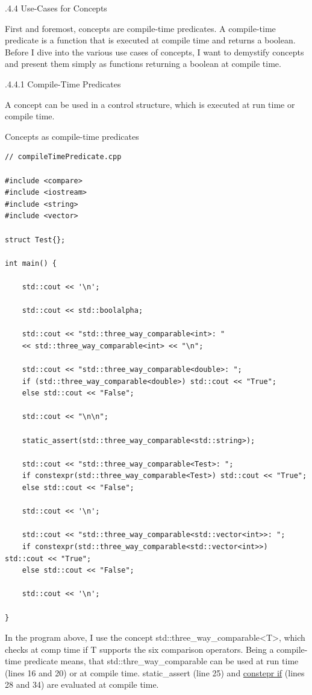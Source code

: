 .4.4\hspace{0.2cm} Use-Cases for Concepts

First and foremost, concepts are compile-time predicates. A compile-time predicate is a function that is executed at compile time and returns a boolean. Before I dive into the various use cases of concepts, I want to demystify concepts and present them simply as functions returning a boolean at compile time.

.4.4.1\hspace{0.2cm} Compile-Time Predicates

A concept can be used in a control structure, which is executed at run time or compile time.

\noindent
Concepts as compile-time predicates
\begin{lstlisting}[style=styleCXX]
// compileTimePredicate.cpp

#include <compare>
#include <iostream>
#include <string>
#include <vector>

struct Test{};

int main() {

	std::cout << '\n';
	
	std::cout << std::boolalpha;
	
	std::cout << "std::three_way_comparable<int>: "
	<< std::three_way_comparable<int> << "\n";
	
	std::cout << "std::three_way_comparable<double>: ";
	if (std::three_way_comparable<double>) std::cout << "True";
	else std::cout << "False";
	
	std::cout << "\n\n";
	
	static_assert(std::three_way_comparable<std::string>);
	
	std::cout << "std::three_way_comparable<Test>: ";
	if constexpr(std::three_way_comparable<Test>) std::cout << "True";
	else std::cout << "False";
	
	std::cout << '\n';
	
	std::cout << "std::three_way_comparable<std::vector<int>>: ";
	if constexpr(std::three_way_comparable<std::vector<int>>) std::cout << "True";
	else std::cout << "False";
	
	std::cout << '\n';

}
\end{lstlisting}

In the program above, I use the concept std::three\_way\_comparable<T>, which checks at comp time if T supports the six comparison operators. Being a compile-time predicate means, that std::thre\_way\_comparable can be used at run time (lines 16 and 20) or at compile time. static\_assert (line 25) and \href{https://en.cppreference.com/w/cpp/language/if}{constepr if} (lines 28 and 34) are evaluated at compile time.

